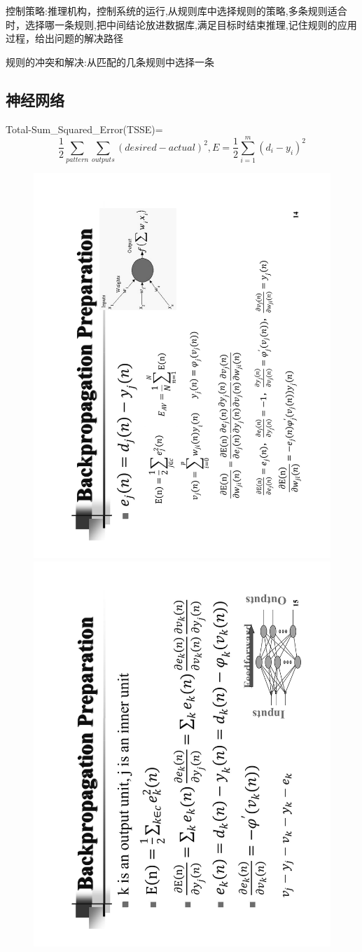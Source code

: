 \documentclass[UTF8,a4paper,landscape,16pt]{paper}
\begin{document}
\begin{multicols}{4}
\noindent 控制策略:推理机构，控制系统的运行,从规则库中选择规则的策略,多条规则适合时，选择哪一条规则,把中间结论放进数据库,满足目标时结束推理,记住规则的应用过程，给出问题的解决路径
  
\noindent 规则的冲突和解决:从匹配的几条规则中选择一条
\subsection{神经网络}
\noindent Total-Sum\_Squared\_Error(TSSE)=$$\frac{1}{2}\sum_{pattern} \sum_{outputs} (desired-actual)^{2},E = \frac{1}{2}\sum_{i=1}^m(d_{i}-y_{i})^{2}$$
\begin{figure}[H]\centering
\includegraphics[height=\columnwidth,angle = -90]{NN/5.pdf}
\includegraphics[height=\columnwidth,angle = -90]{NN/6.pdf}

\end{figure}
\end{multicols}
\end{document}

